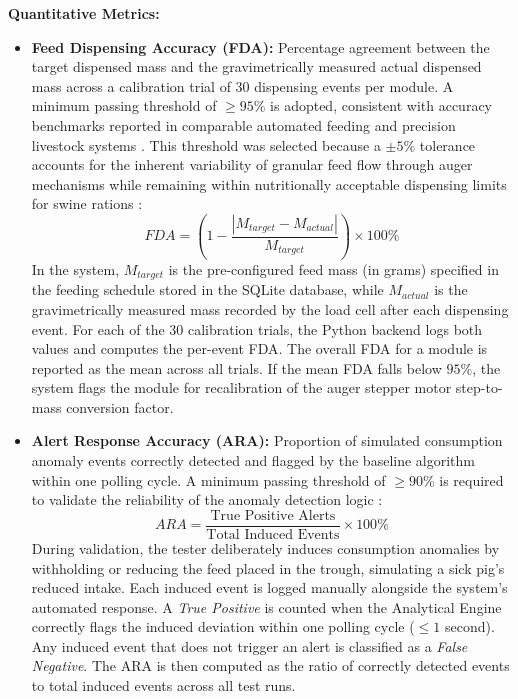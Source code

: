 \textbf{Quantitative Metrics:}
\begin{itemize}
  \item \textbf{Feed Dispensing Accuracy (FDA):} Percentage agreement between the target dispensed mass and the gravimetrically measured actual dispensed mass across a calibration trial of 30 dispensing events per module. A minimum passing threshold of $\geq 95\%$ is adopted, consistent with accuracy benchmarks reported in comparable automated feeding and precision livestock systems \cite{adeoye2025animalia,dingcong2017monitoring,zhang2025precision}. This threshold was selected because a $\pm 5\%$ tolerance accounts for the inherent variability of granular feed flow through auger mechanisms while remaining within nutritionally acceptable dispensing limits for swine rations \cite{chen2024screw,tangorra2018energy}:
    \begin{equation}
      FDA = \left(1 - \frac{|M_{target} - M_{actual}|}{M_{target}}\right) \times 100\%
    \end{equation}
    In the system, $M_{target}$ is the pre-configured feed mass (in grams) specified in the feeding schedule stored in the SQLite database, while $M_{actual}$ is the gravimetrically measured mass recorded by the load cell after each dispensing event. For each of the 30 calibration trials, the Python backend logs both values and computes the per-event FDA. The overall FDA for a module is reported as the mean across all trials. If the mean FDA falls below $95\%$, the system flags the module for recalibration of the auger stepper motor step-to-mass conversion factor.
  \item \textbf{Alert Response Accuracy (ARA):} Proportion of simulated consumption anomaly events correctly detected and flagged by the baseline algorithm within one polling cycle. A minimum passing threshold of $\geq 90\%$ is required to validate the reliability of the anomaly detection logic \cite{sadeghi2023improving,racewicz2021welfare}:
    \begin{equation}
      ARA = \frac{\text{True Positive Alerts}}{\text{Total Induced Events}} \times 100\%
    \end{equation}
    During validation, the tester deliberately induces consumption anomalies by withholding or reducing the feed placed in the trough, simulating a sick pig's reduced intake. Each induced event is logged manually alongside the system's automated response. A \textit{True Positive} is counted when the Analytical Engine correctly flags the induced deviation within one polling cycle ($\leq 1$ second). Any induced event that does not trigger an alert is classified as a \textit{False Negative}. The ARA is then computed as the ratio of correctly detected events to total induced events across all test runs.

\end{itemize}
